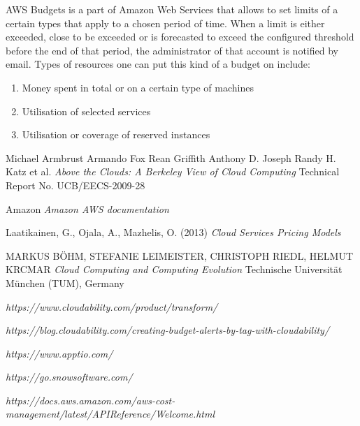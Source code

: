 \documentclass[licencjacka,en]{thesisclass}
\begin{document}
        AWS Budgets is a part of Amazon Web Services that allows to set limits of a certain types
        that apply to a chosen period of time. When a limit is either exceeded,
        close to be exceeded or is forecasted to exceed the configured threshold before the end of that period,
        the administrator of that account is notified by email. Types of resources one can put this kind of a budget on include:
        
        \begin{enumerate}
            \item Money spent in total or on a certain type of machines
            \item Utilisation of selected services
            \item Utilisation or coverage of reserved instances
        \end{enumerate}


    
\begin{thebibliography}{99}

    Michael Armbrust Armando Fox Rean Griffith Anthony D. Joseph Randy H. Katz et al.
    \textit{Above the Clouds: A Berkeley View of Cloud Computing} 
    Technical Report No. UCB/EECS-2009-28

    Amazon
    \textit{Amazon AWS documentation} 
        
    Laatikainen, G., Ojala, A., Mazhelis, O. (2013)
    \textit{Cloud Services Pricing Models}

    MARKUS BÖHM, STEFANIE LEIMEISTER, CHRISTOPH RIEDL, HELMUT KRCMAR
    \textit{Cloud Computing and Computing Evolution}
    Technische Universität München (TUM), Germany

    \textit{https://www.cloudability.com/product/transform/}

    \textit{https://blog.cloudability.com/creating-budget-alerts-by-tag-with-cloudability/}

    \textit{https://www.apptio.com/}

    \textit{https://go.snowsoftware.com/}

    \textit{https://docs.aws.amazon.com/aws-cost-management/latest/APIReference/Welcome.html}

\end{thebibliography}
\end{document}
